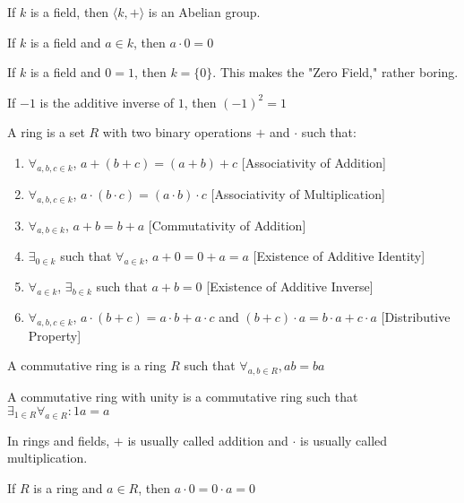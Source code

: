 \documentclass[crop=false,class=book,oneside]{standalone}
\begin{document}
\begin{theorem}
If $k$ is a field, then $\langle k, + \rangle$ is an Abelian group.
\end{theorem}
\begin{theorem}
If $k$ is a field and $a\in k$, then $a\cdot 0 = 0$
\end{theorem}
\begin{remark}
If $k$ is a field and $0=1$, then $k=\{0\}$. This makes the "Zero Field," rather boring.
\end{remark}
\begin{theorem}
If $-1$ is the additive inverse of $1$, then $(-1)^2 = 1$
\end{theorem}
\begin{definition}
A ring is a set $R$ with two binary operations $+$ and $\cdot$ such that:
\begin{enumerate}
    \item $\forall_{a,b,c\in k}$, $a+(b+c)=(a+b)+c$ \hfill [Associativity of Addition]
    \item $\forall_{a,b,c\in k}$, $a\cdot(b\cdot c) = (a\cdot b)\cdot c$ \hfill [Associativity of Multiplication]
    \item $\forall_{a,b\in k}$, $a+b=b+a$ \hfill [Commutativity of Addition]
    \item $\exists_{0 \in k}$ such that $\forall_{a\in k}$, $a+0=0+a = a$ \hfill [Existence of Additive Identity]
    \item $\forall_{a\in k}$, $\exists_{b\in k}$ such that $a+b=0$ \hfill [Existence of Additive Inverse]
    \item $\forall_{a,b,c\in k}$, $a\cdot(b+c) = a\cdot b + a\cdot c$ and $(b+c)\cdot a = b\cdot a + c\cdot a$ \hfill [Distributive Property]
\end{enumerate}
\end{definition}
\begin{definition}
A commutative ring is a ring $R$ such that $\forall_{a,b\in R},ab=ba$
\end{definition}
\begin{definition}
A commutative ring with unity is a commutative ring such that $\exists_{1\in R}\forall_{a\in R}:1a=a$
\end{definition}
\begin{remark}
In rings and fields, $+$ is usually called addition and $\cdot$ is usually called multiplication.
\end{remark}
\begin{corollary}
If $R$ is a ring and $a\in R$, then $a\cdot 0 = 0\cdot a=0$
\end{corollary}
\end{document}
